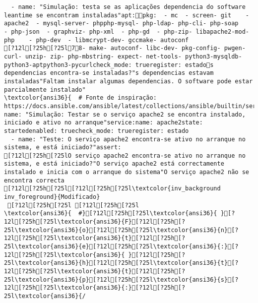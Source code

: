\documentclass{scrartcl}
\begin{document}
\begin{Verbatim}
  - name: "Simulação: testa se as aplicações dependencia do software leantime se encontram instaladas"apt:pkg:  - mc  - screen- git    - apache2  - mysql-server- phpphp-mysql- php-ldap- php-cli- php-soap    - php-json  - graphviz- php-xml  - php-gd  - php-zip- libapache2-mod-php    - php-dev  - libmcrypt-dev- gccmake- autoconf
[?12l[?25h[?25l78- make- autoconf- libc-dev- pkg-config- pwgen- curl- unzip- zip- php-mbstring- expect- net-tools- python3-mysqldb- python3-aptpython3-pycurlcheck_mode: trueregister: estados dependencias encontra-se instaladas?"s dependencias estavam instaladas"Faltam instalar algumas dependencias. O software pode estar parcialmente instalado"
\textcolor{ansi36}{  # Fonte de inspiração: https://docs.ansible.com/ansible/latest/collections/ansible/builtin/service_module.html}- name: "Simulação: Testar se o serviço apache2 se encontra instalado, iniciado e ativo no arranque"service:name: apache2state: startedenabled: truecheck_mode: trueregister: estado
  - name: "Teste: O serviço apache2 encontra-se ativo no arranque no sistema, e está iniciado?"assert:
[?12l[?25h[?25lO serviço apache2 encontra-se ativo no arranque no sistema, e está iniciado?"O serviço apache2 está correctamente instalado e inicia com o arranque do sistema"O serviço apache2 não se encontra correcta
[?12l[?25h[?25l[?12l[?25h[?25l\textcolor{inv_background inv_foreground}{Modificado}
 [?12l[?25h[?25l [?12l[?25h[?25l
\textcolor{ansi36}{  #}[?12l[?25h[?25l\textcolor{ansi36}{ }[?12l[?25h[?25l\textcolor{ansi36}{F}[?12l[?25h[?25l\textcolor{ansi36}{o}[?12l[?25h[?25l\textcolor{ansi36}{n}[?12l[?25h[?25l\textcolor{ansi36}{t}[?12l[?25h[?25l\textcolor{ansi36}{e}[?12l[?25h[?25l\textcolor{ansi36}{:}[?12l[?25h[?25l\textcolor{ansi36}{ }[?12l[?25h[?25l\textcolor{ansi36}{h}[?12l[?25h[?25l\textcolor{ansi36}{t}[?12l[?25h[?25l\textcolor{ansi36}{t}[?12l[?25h[?25l\textcolor{ansi36}{p}[?12l[?25h[?25l\textcolor{ansi36}{s}[?12l[?25h[?25l\textcolor{ansi36}{:}[?12l[?25h[?25l\textcolor{ansi36}{/

\end{Verbatim}
\end{document}
